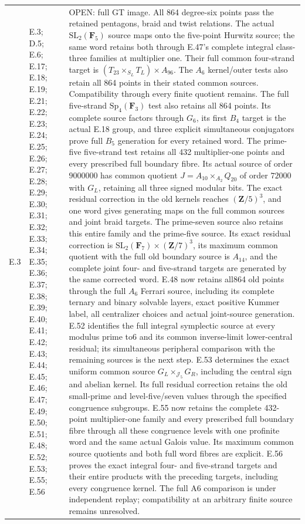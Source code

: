 \begin{longtable}{@{}p{1.1cm}p{3.0cm}p{10.3cm}@{}}
E.3 & E.3; D.5; E.6; E.17; E.18; E.19; E.21; E.22; E.23; E.24; E.25; E.26; E.27; E.28; E.29; E.30; E.31; E.32; E.33; E.34; E.35; E.36; E.37; E.38; E.39; E.40; E.41; E.42; E.43; E.44; E.45; E.46; E.47; E.49; E.50; E.51; E.48; E.52; E.53; E.55; E.56 & OPEN: full GT image. All 864 degree-six points pass the retained pentagons, braid and twist relations. The actual $\mathrm{SL}_2(\mathbf F_5)$ source maps onto the five-point Hurwitz source; the same word retains both through E.47's complete integral class-three families at multiplier one. Their full common four-strand target is $(T_{23}\times_{S_L}T_L)\times A_{96}$. The $A_6$ kernel/outer tests also retain all 864 points in their stated common sources. Compatibility through every finite quotient remains. The full five-strand $\mathrm{Sp}_4(\mathbf F_3)$ test also retains all 864 points. Its complete source factors through $G_6$, its first $B_4$ target is the actual E.18 group, and three explicit simultaneous conjugators prove full $B_5$ generation for every retained word. The prime-five five-strand test retains all 432 multiplier-one points and every prescribed full boundary fibre. Its actual source of order $9000000$ has common quotient $J=A_{10}\times_{A_2}Q_{20}$ of order $72000$ with $G_L$, retaining all three signed modular bits. The exact residual correction in the old kernels reaches $(\mathbf Z/5)^3$, and one word gives generating maps on the full common sources and joint braid targets. The prime-seven source also retains this entire family and the prime-five source. Its exact residual correction is $\mathrm{SL}_2(\mathbf F_7)\times(\mathbf Z/7)^3$, its maximum common quotient with the full old boundary source is $A_{14}$, and the complete joint four- and five-strand targets are generated by the same corrected word. E.48 now retains all864 old points through the full $A_6$ Ferrari source, including its complete ternary and binary solvable layers, exact positive Kummer label, all centralizer choices and actual joint-source generation. E.52 identifies the full integral symplectic source at every modulus prime to6 and its common inverse-limit lower-central residual; its simultaneous peripheral comparison with the remaining sources is the next step. E.53 determines the exact uniform common source $G_L\times_{\mathcal J_5}G_R$, including the central sign and abelian kernel. Its full residual correction retains the old small-prime and level-five/seven values through the specified congruence subgroups. E.55 now retains the complete 432-point multiplier-one family and every prescribed full boundary fibre through all these congruence levels with one profinite word and the same actual Galois value. Its maximum common source quotients and both full word fibres are explicit. E.56 proves the exact integral four- and five-strand targets and their entire products with the preceding targets, including every congruence kernel. The full A6 comparison is under independent replay; compatibility at an arbitrary finite source remains unresolved. \\

\end{longtable}
